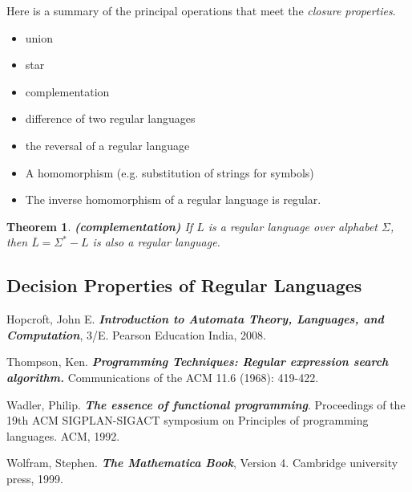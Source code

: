 \documentclass[12pt,reqno]{amsart}
\newtheorem{thm}{Theorem}[section]
\begin{document}
Here is a summary of the principal operations that meet the \textit{closure properties}.
\begin{itemize}
	\item union
	\item star
	\item complementation
	\item difference of two regular languages
	\item the reversal of a regular language
	\item A homomorphism (e.g. substitution of strings for symbols)
	\item The inverse homomorphism of a regular language is regular.
\end{itemize}

\begin{thm}\textbf{(complementation)}
	If $L$ is a regular language over alphabet $\Sigma$, then $\overline{L} = \Sigma^*-L$ is also a regular language.
\end{thm}

\subsection{Decision Properties of Regular Languages}



\begin{thebibliography}{99} %

Hopcroft, John E. \textbf{\textit{Introduction to Automata Theory, Languages, and Computation}}, 3/E. Pearson Education India, 2008.

Thompson, Ken. \textbf{\textit{Programming Techniques: Regular expression search algorithm.}} Communications of the ACM 11.6 (1968): 419-422.

Wadler, Philip. \textbf{\textit{The essence of functional programming}}. Proceedings of the 19th ACM SIGPLAN-SIGACT symposium on Principles of programming languages. ACM, 1992.


Wolfram, Stephen. \textbf{\textit{The Mathematica Book}}, Version 4. Cambridge university press, 1999.

\end{thebibliography}
\end{document}
